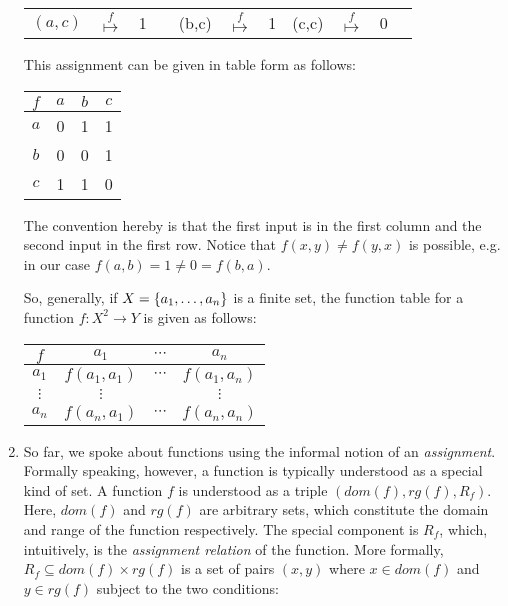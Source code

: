 \begin{enumerate}[\thesection.1]
\begin{center}
\begin{tabular}{c c c c c c c c c c c}
	$(a,c)$ & $\overset{f}{\mapsto}$ & 1 & \quad & (b,c) & $\overset{f}{\mapsto}$ & 1  \quad & (c,c) & $\overset{f}{\mapsto}$ & 0\\


	\end{tabular}
\end{center}

This assignment can be given in table form as follows:

\begin{center}
	\begin{tabular}{ c | c c c}
	$f$ & $a$ & $b$ & $c$ \\ \hline
	
	$a$ & 0 & 1 & 1\\
	
	$b$ & 0 & 0 & 1\\
	
	$c$ & 1 & 1 & 0
	
	\end{tabular} 
	
\end{center}

The convention hereby is that the first input is in the first column and the second input in the first row. Notice that $f(x,y)\neq f(y,x)$ is possible, e.g. in our case $f(a,b)=1\neq 0=f(b,a)$.

So, generally, if $X=\{a_1, \mathellipsis, a_n\}$ is a finite set, the function table for a function $f:X^2\to Y$ is given as follows:

\begin{center}
	\begin{tabular}{ c | c c c}
	$f$ & $a_1$ & $\cdots$ & $a_n$ \\ \hline
	
	$a_1$ &  $f(a_1, a_1)$ & $\cdots$ & $f(a_1, a_n)$\\
	
	$\vdots$ & $\vdots$ & & $\vdots$\\
	
	$a_n$ &  $f(a_n, a_1)$ & $\cdots$ & $f(a_n, a_n)$\\
	
	\end{tabular} 
	
\end{center}

	\item So far, we spoke about functions using the informal notion of an \emph{assignment}. Formally speaking, however, a function is typically understood as a special kind of set. A function $f$ is understood as a triple $(dom(f), rg(f), R_f)$. Here, $dom(f)$ and $rg(f)$ are arbitrary sets, which constitute the domain and range of the function respectively. The special component is $R_f$, which, intuitively, is the \emph{assignment relation} of the function. More formally, $R_f\subseteq dom(f)\times rg(f)$ is a set of pairs $(x,y)$ where $x\in dom(f)$ and $y\in rg(f)$ subject to the two conditions:
	\begin{description}
	

\end{description}
\end{enumerate}

